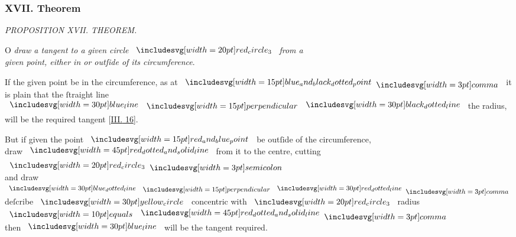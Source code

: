 \documentclass[12pt,preview]{standalone}
\begin{document}
\subsubsection{XVII. Theorem}

\begin{minipage}[t]{0.33\textwidth}
    \vspace{40pt}
    
\end{minipage}%
\hfill
\begin{minipage}[t]{0.64\textwidth}
    \vspace{0pt}

    \begin{center}
        \textit{PROPOSITION XVII. THEOREM.}\label{book3pr17} \\
    \end{center}

    \hfill

    \begin{center}
        \raggedright \lettrine[lines=4, loversize=1, nindent=0pt]{}{}O \textit{draw a tangent to a given circle} $\img[0][0][20]{red_circle_3}$ \textit{from a\\ given point, either in or outſide of its circumference}.
    \end{center}

    \hfill

    \hfill

    \hfill

    \raggedright If the given point be in the circumference, as at $\img[0][0][15]{blue_and_black_dotted_point} \bcomma$ it is plain that the ſtraight line $\blueline \bperp \dottedblackline$ the radius, will be the required tangent [\hyperref[book3pr6]{\textsc{III.} 16}].

    \hfill

    \begin{center}
        But if given the point $\img[0][0][15]{red_and_blue_point}$ be outſide of the circumference,\\
        draw $\bimg{red_dotted_and_solid_line}$ from it to the centre, cutting $\img[0][0][20]{red_circle_3} \bsemicolon$\\
        and draw $\dottedblueline \bperp \dottedredline \bcomma$\\
        deſcribe $\img[0][0][30]{yellow_circle}$ concentric with $\img[0][0][20]{red_circle_3}$ radius $\bequals \bimg{red_dotted_and_solid_line} \bcomma$\\
        then $\blueline$ will be the tangent required.
    \end{center}


\end{minipage}
\end{document}
